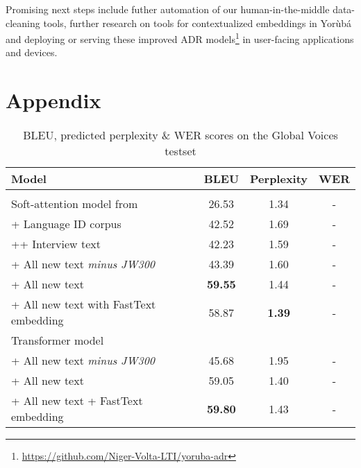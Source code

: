 \documentclass{article} %
\begin{document}
Promising next steps include futher automation of our human-in-the-middle data-cleaning tools, further research on tools for contextualized embeddings in Yor{\`u}b{\'a} and deploying or serving these improved ADR models\footnote{\url{https://github.com/Niger-Volta-LTI/yoruba-adr}} in user-facing applications and devices.  





\clearpage

\appendix
\section{Appendix}\label{sec:appendix}

 \begin{table}[h]
  \caption{BLEU, predicted perplexity \& WER scores on the Global Voices testset}
  \label{tab:results-appendix}
 \begin{center}
  \begin{tabular}{lccc}
    \toprule
    \textbf{Model} & \textbf{BLEU} &\textbf{Perplexity} &\textbf{WER}\\
    \bottomrule
    \\
    Soft-attention model from \citep{orife2018adr} & 26.53 & 1.34 & -\\
    \midrule
	\hspace{5mm} + Language ID corpus & 42.52 & 1.69 & -\\ 
	\hspace{10mm} ++ Interview text & 42.23 & 1.59 & -\\
	\hspace{5mm} + All new text \it{minus} JW300 & 43.39 & 1.60 & -\\ 
	\hspace{5mm} + All new text & \textbf{59.55} & 1.44 & -\\ 
	\hspace{5mm} + All new text with FastText embedding & 58.87 & \textbf{1.39} & -\\ 
    \midrule
	Transformer model \\
	 \hspace{5mm} + All new text \it{minus} JW300 & 45.68 & 1.95 & -\\
	 \hspace{5mm} + All new text & 59.05 & 1.40 & -\\
	 \hspace{5mm} + All new text + FastText embedding & \textbf{59.80} & 1.43 & -\\ 
    \bottomrule
  \end{tabular}
  \end{center}
\end{table}
\end{document}
